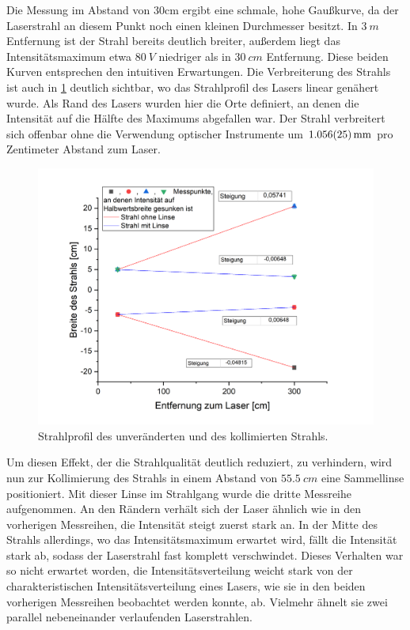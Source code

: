 \documentclass[
	a4paper,
	12pt,
	pagesize,
	ngerman
]{scrartcl}
\begin{document}
Die Messung im Abstand von 30cm ergibt eine schmale, hohe Gaußkurve, da der Laserstrahl an diesem Punkt noch einen kleinen Durchmesser besitzt. In $\SI{3}{m}$ Entfernung ist der Strahl bereits deutlich breiter, außerdem liegt das Intensitätsmaximum etwa $\SI{80}{V}$ niedriger als in $\SI{30}{cm}$ Entfernung. Diese beiden Kurven entsprechen den intuitiven Erwartungen. Die Verbreiterung des Strahls ist auch in \cref{strahlprofil} deutlich sichtbar, wo das Strahlprofil des Lasers linear genähert wurde. Als Rand des Lasers wurden hier die Orte definiert, an denen die Intensität auf die Hälfte des Maximums abgefallen war. Der Strahl verbreitert sich offenbar ohne die Verwendung optischer Instrumente um $\SI{1,056\pm0,025}{mm}$ pro Zentimeter Abstand zum Laser.

\begin{figure}[h!]
	\centering
	\includegraphics[scale=0.5]{strahlprofil.png}
	\caption{Strahlprofil des unveränderten und des kollimierten Strahls.}
	\label{strahlprofil}
\end{figure}

Um diesen Effekt, der die Strahlqualität deutlich reduziert, zu verhindern, wird nun zur Kollimierung des Strahls in einem Abstand von $\SI{55,5}{cm}$ eine Sammellinse positioniert. Mit dieser Linse im Strahlgang wurde die dritte Messreihe aufgenommen. An den Rändern verhält sich der Laser ähnlich wie in den vorherigen Messreihen, die Intensität steigt zuerst stark an. In der Mitte des Strahls allerdings, wo das Intensitätsmaximum erwartet wird, fällt die Intensität stark ab, sodass der Laserstrahl fast komplett verschwindet. Dieses Verhalten war so nicht erwartet worden, die Intensitätsverteilung weicht stark von der charakteristischen Intensitätsverteilung eines Lasers, wie sie in den beiden vorherigen Messreihen beobachtet werden konnte, ab. Vielmehr ähnelt sie zwei parallel nebeneinander verlaufenden Laserstrahlen.
\end{document}
